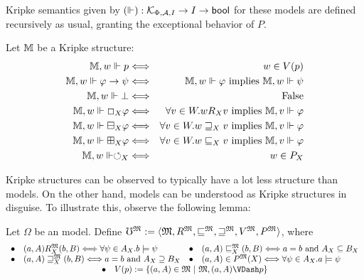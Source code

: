 Kripke semantics given by $(\Vdash) : \mathcal{K}_{\Phi, \mathcal{A}, I} \to I
\rightarrow \text{\tmtextsf{bool}}$ for these models are defined recursively
as usual, granting the exceptional behavior of $P$.
\begin{definition}
  Let $\mathbbm{M}$ be a Kripke structure:
  \begin{eqnarray*}
    \mathbbm{M}, w \Vdash p & \Longleftrightarrow & w \in V
    (p)\\
    \mathbbm{M}, w \Vdash \phi \rightarrow \psi & \Longleftrightarrow &
    \mathbbm{M}, w \Vdash \phi \text{ implies } \mathbbm{M}, w \Vdash \psi\\
    \mathbbm{M}, w \Vdash \bot & \Longleftrightarrow & \text{False}\\
    \mathbbm{M}, w \Vdash \Box_X \phi & \Longleftrightarrow & \forall v \in
    W . w R_X v \text{ implies } \mathbbm{M}, v
    \Vdash \phi\\
    \mathbbm{M}, w \Vdash \boxminus_X \phi & \Longleftrightarrow & \forall v
    \in W . w \sqsupseteq_X v \text{ implies }
    \mathbbm{M}, v \Vdash \phi\\
    \mathbbm{M}, w \Vdash \boxplus_X \phi & \Longleftrightarrow & \forall v
    \in W . w \sqsubseteq_X v \text{ implies }
    \mathbbm{M}, v \Vdash \phi\\
    \mathbbm{M}, w \Vdash \circlearrowleft_X & \Longleftrightarrow & w \in
    P_X
  \end{eqnarray*}
\end{definition}
Kripke structures can be observed to typically have a lot less structure than
 models.  On the other hand,   models
can be understood as Kripke structures in disguise.  To illustrate
this, observe the following lemma:
\begin{definition}\label{omega-translation}
Let $\Omega$ be an  model.  Define
  $\mho^{\Omega} \assign \langle \Omega, R^{\Omega},
  \sqsubseteq^{\Omega}, \sqsupseteq^{\Omega}, V^{\Omega},
  P^{\Omega} \rangle$, where
  \[ \begin{array}{llll}
       \bullet & \text{$(a, A) R^{\Omega}_X (b, B) \Longleftrightarrow \forall
       \psi \in A_X .b \models \psi$} & \bullet & (a, A)
       \sqsubseteq^{\Omega}_X (b, B) \Longleftrightarrow a = b \text{ and }
       A_X \subseteq B_X\\
       \bullet & (a, A) \sqsupseteq^{\Omega}_X (b, B) \Longleftrightarrow a =
       b \text{ and } A_X \supseteq B_X & \bullet & (a, A) \in
       P^{\Omega} (X) \Longleftrightarrow \forall \psi \in
       A_X .a \models \psi \\
\multicolumn{4}{c}{\bullet\ \ \ V(p) := \{ (a,A) \in \mathfrak{M} \ |\ \mathfrak{M},(a,A)\VDash p\}}
     \end{array} \]
\end{definition}

